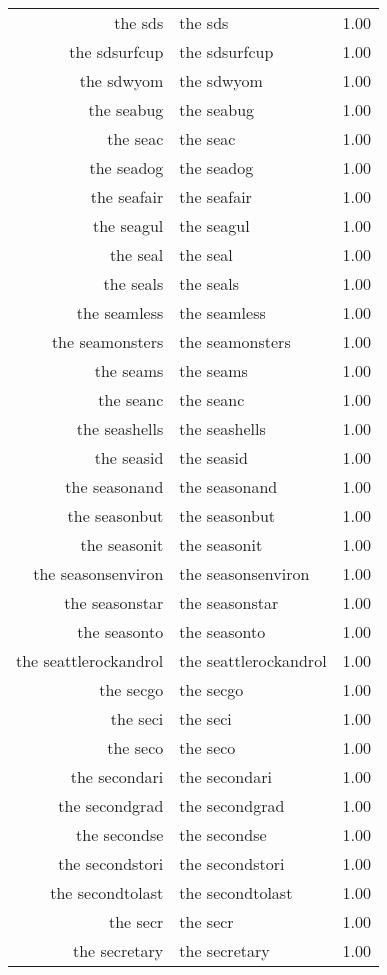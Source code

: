 \begin{table}[ht]
\begin{tabular}{rlr}
  the sds & the sds & 1.00 \\ 
  the sdsurfcup & the sdsurfcup & 1.00 \\ 
  the sdwyom & the sdwyom & 1.00 \\ 
  the seabug & the seabug & 1.00 \\ 
  the seac & the seac & 1.00 \\ 
  the seadog & the seadog & 1.00 \\ 
  the seafair & the seafair & 1.00 \\ 
  the seagul & the seagul & 1.00 \\ 
  the seal & the seal & 1.00 \\ 
  the seals & the seals & 1.00 \\ 
  the seamless & the seamless & 1.00 \\ 
  the seamonsters & the seamonsters & 1.00 \\ 
  the seams & the seams & 1.00 \\ 
  the seanc & the seanc & 1.00 \\ 
  the seashells & the seashells & 1.00 \\ 
  the seasid & the seasid & 1.00 \\ 
  the seasonand & the seasonand & 1.00 \\ 
  the seasonbut & the seasonbut & 1.00 \\ 
  the seasonit & the seasonit & 1.00 \\ 
  the seasonsenviron & the seasonsenviron & 1.00 \\ 
  the seasonstar & the seasonstar & 1.00 \\ 
  the seasonto & the seasonto & 1.00 \\ 
  the seattlerockandrol & the seattlerockandrol & 1.00 \\ 
  the secgo & the secgo & 1.00 \\ 
  the seci & the seci & 1.00 \\ 
  the seco & the seco & 1.00 \\ 
  the secondari & the secondari & 1.00 \\ 
  the secondgrad & the secondgrad & 1.00 \\ 
  the secondse & the secondse & 1.00 \\ 
  the secondstori & the secondstori & 1.00 \\ 
  the secondtolast & the secondtolast & 1.00 \\ 
  the secr & the secr & 1.00 \\ 
  the secretary & the secretary & 1.00 \\ 

\end{tabular}
\end{table}
